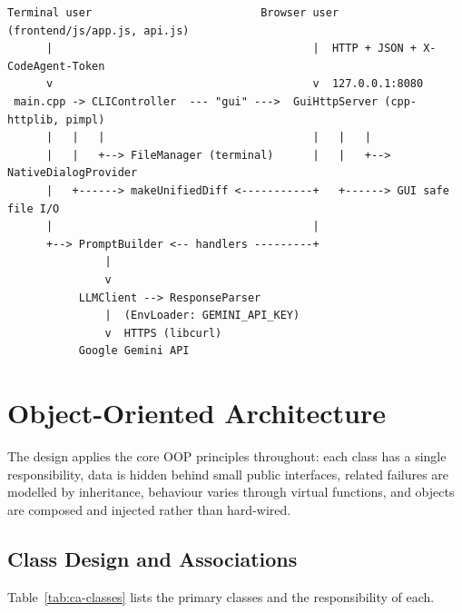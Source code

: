\documentclass[12pt,a4paper,oneside]{book}
\begin{document}
\begin{lstlisting}[style=codeagentplain,caption={Layered architecture of CodeAgent},label={lst:ca-arch}]
 Terminal user                          Browser user (frontend/js/app.js, api.js)
      |                                        |  HTTP + JSON + X-CodeAgent-Token
      v                                        v  127.0.0.1:8080
 main.cpp -> CLIController  --- "gui" --->  GuiHttpServer (cpp-httplib, pimpl)
      |   |   |                                |   |   |
      |   |   +--> FileManager (terminal)      |   |   +--> NativeDialogProvider
      |   +------> makeUnifiedDiff <-----------+   +------> GUI safe file I/O
      |                                        |
      +--> PromptBuilder <-- handlers ---------+
               |
               v
           LLMClient --> ResponseParser
               |  (EnvLoader: GEMINI_API_KEY)
               v  HTTPS (libcurl)
           Google Gemini API
\end{lstlisting}

\section{Object-Oriented Architecture}
\label{sec:ca-oop}

The design applies the core OOP principles throughout: each class has a single
responsibility, data is hidden behind small public interfaces, related
failures are modelled by inheritance, behaviour varies through virtual
functions, and objects are composed and injected rather than hard-wired.

\subsection{Class Design and Associations}

Table~\ref{tab:ca-classes} lists the primary classes and the responsibility of
each.
\end{document}
